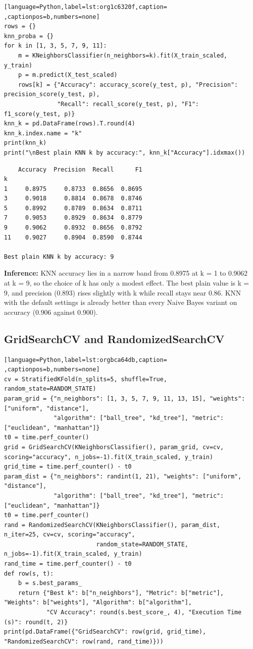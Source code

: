 \documentclass[11pt]{article}
\begin{document}
\begin{lstlisting}[language=Python,label=lst:org1c6320f,caption= ,captionpos=b,numbers=none]
rows = {}
knn_proba = {}
for k in [1, 3, 5, 7, 9, 11]:
    m = KNeighborsClassifier(n_neighbors=k).fit(X_train_scaled, y_train)
    p = m.predict(X_test_scaled)
    rows[k] = {"Accuracy": accuracy_score(y_test, p), "Precision": precision_score(y_test, p),
               "Recall": recall_score(y_test, p), "F1": f1_score(y_test, p)}
knn_k = pd.DataFrame(rows).T.round(4)
knn_k.index.name = "k"
print(knn_k)
print("\nBest plain KNN k by accuracy:", knn_k["Accuracy"].idxmax())
\end{lstlisting}

\begin{verbatim}
    Accuracy  Precision  Recall      F1
k                                      
1     0.8975     0.8733  0.8656  0.8695
3     0.9018     0.8814  0.8678  0.8746
5     0.8992     0.8789  0.8634  0.8711
7     0.9053     0.8929  0.8634  0.8779
9     0.9062     0.8932  0.8656  0.8792
11    0.9027     0.8904  0.8590  0.8744

Best plain KNN k by accuracy: 9
\end{verbatim}

\textbf{Inference:} KNN accuracy lies in a narrow band from 0.8975 at k = 1 to 0.9062 at k = 9, so the choice of
k has only a modest effect. The best plain value is k = 9, and precision (0.893) rises
slightly with k while recall stays near 0.86. KNN with the default settings is already
better than every Naive Bayes variant on accuracy (0.906 against 0.900).

\subsection*{GridSearchCV and RandomizedSearchCV}
\label{sec:org2588d8c}

\begin{lstlisting}[language=Python,label=lst:orgbca64db,caption= ,captionpos=b,numbers=none]
cv = StratifiedKFold(n_splits=5, shuffle=True, random_state=RANDOM_STATE)
param_grid = {"n_neighbors": [1, 3, 5, 7, 9, 11, 13, 15], "weights": ["uniform", "distance"],
              "algorithm": ["ball_tree", "kd_tree"], "metric": ["euclidean", "manhattan"]}
t0 = time.perf_counter()
grid = GridSearchCV(KNeighborsClassifier(), param_grid, cv=cv, scoring="accuracy", n_jobs=-1).fit(X_train_scaled, y_train)
grid_time = time.perf_counter() - t0
param_dist = {"n_neighbors": randint(1, 21), "weights": ["uniform", "distance"],
              "algorithm": ["ball_tree", "kd_tree"], "metric": ["euclidean", "manhattan"]}
t0 = time.perf_counter()
rand = RandomizedSearchCV(KNeighborsClassifier(), param_dist, n_iter=25, cv=cv, scoring="accuracy",
                          random_state=RANDOM_STATE, n_jobs=-1).fit(X_train_scaled, y_train)
rand_time = time.perf_counter() - t0
def row(s, t):
    b = s.best_params_
    return {"Best k": b["n_neighbors"], "Metric": b["metric"], "Weights": b["weights"], "Algorithm": b["algorithm"],
            "CV Accuracy": round(s.best_score_, 4), "Execution Time (s)": round(t, 2)}
print(pd.DataFrame({"GridSearchCV": row(grid, grid_time), "RandomizedSearchCV": row(rand, rand_time)}))
\end{lstlisting}
\end{document}

